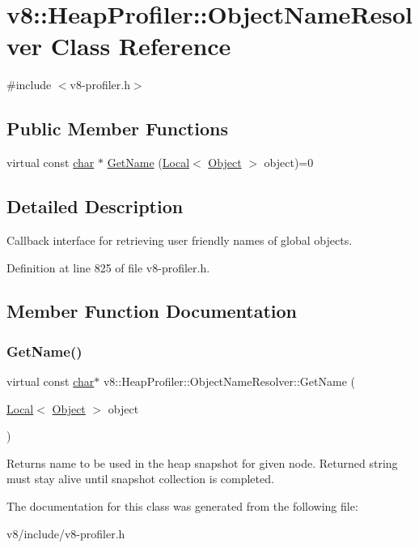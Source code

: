\hypertarget{classv8_1_1HeapProfiler_1_1ObjectNameResolver}{}\section{v8\+:\+:Heap\+Profiler\+:\+:Object\+Name\+Resolver Class Reference}
\label{classv8_1_1HeapProfiler_1_1ObjectNameResolver}


{\ttfamily \#include $<$v8-\/profiler.\+h$>$}

\subsection*{Public Member Functions}
\begin{DoxyCompactItemize}
\item 
virtual const \mbox{\hyperlink{classchar}{char}} $\ast$ \mbox{\hyperlink{classv8_1_1HeapProfiler_1_1ObjectNameResolver_aa9ac9e83806c7c746b652f435cf66622}{Get\+Name}} (\mbox{\hyperlink{classv8_1_1Local}{Local}}$<$ \mbox{\hyperlink{classv8_1_1Object}{Object}} $>$ object)=0
\end{DoxyCompactItemize}


\subsection{Detailed Description}
Callback interface for retrieving user friendly names of global objects. 

Definition at line 825 of file v8-\/profiler.\+h.



\subsection{Member Function Documentation}
\mbox{\label{classv8_1_1HeapProfiler_1_1ObjectNameResolver_aa9ac9e83806c7c746b652f435cf66622}} 
\subsubsection{\texorpdfstring{Get\+Name()}{GetName()}}
{\footnotesize\ttfamily virtual const \mbox{\hyperlink{classchar}{char}}$\ast$ v8\+::\+Heap\+Profiler\+::\+Object\+Name\+Resolver\+::\+Get\+Name (\begin{DoxyParamCaption}\item[{\mbox{\hyperlink{classv8_1_1Local}{Local}}$<$ \mbox{\hyperlink{classv8_1_1Object}{Object}} $>$}]{object }\end{DoxyParamCaption})\hspace{0.3cm}{\ttfamily [pure virtual]}}

Returns name to be used in the heap snapshot for given node. Returned string must stay alive until snapshot collection is completed. 

The documentation for this class was generated from the following file\+:\begin{DoxyCompactItemize}
\item 
v8/include/v8-\/profiler.\+h\end{DoxyCompactItemize}
